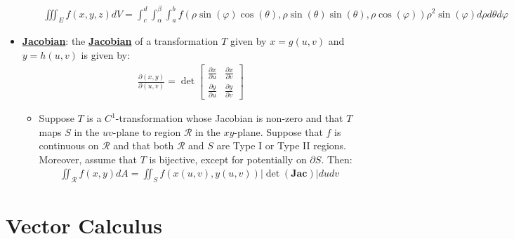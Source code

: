 \documentclass[reqno,11pt]{amsart}
\theoremstyle{definition}
\theoremstyle{remark}
\newcommand{\dfn}[1]{\underline{\textbf{#1}}}
\begin{document}
\begin{itemize}
\begin{itemize}[noitemsep]
		\begin{align}
			\iiint_E f(x,y,z) dV = \int_c^d \int_\alpha^\beta \int_a^b f(\rho \sin (\varphi) \cos (\theta), \rho \sin (\theta) \sin (\theta), \rho \cos (\varphi) ) \rho^2 \sin (\varphi) d \rho d \theta d \varphi 	
		\end{align}
	\end{itemize}
	\item \dfn{Jacobian}: the \dfn{Jacobian} of a transformation $T$ given by $x = g(u,v)$ and $y=h(u,v)$ is given by: 
	\begin{align}
		\frac{\partial (x,y)}{\partial (u,v)} = \det \begin{bmatrix}
			\frac{\partial x}{\partial u} & \frac{\partial x}{\partial v} \\
			\frac{\partial y}{\partial u} & \frac{\partial y}{\partial v}
		\end{bmatrix}	
	\end{align}
	\begin{itemize}[noitemsep]
		\item Suppose $T$ is a $C^1$-transformation whose Jacobian is non-zero and that $T$ maps $S$ in the $uv$-plane to region $\mathcal{R}$ in the $xy$-plane. Suppose that $f$ is continuous on $\mathcal{R}$ and that both $\mathcal{R}$ and $S$ are Type I or Type II regions. Moreover, assume that $T$ is bijective, except for potentially on $\partial S$. Then: 
		\begin{align}
			\iint_{\mathcal{R}} f(x,y) dA = \iint_S f(x(u,v), y(u,v)) | \det (\mathbf{Jac}) | du dv 	
		\end{align}
	\end{itemize}
\end{itemize}

\section{Vector Calculus}
\end{document}
